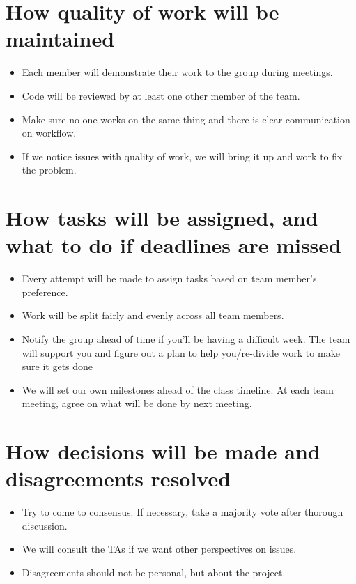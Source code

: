 \documentclass{article}
\begin{document}
\section*{How quality of work will be maintained}
\begin{itemize}
\item Each member will demonstrate their work to the group during meetings.
\item Code will be reviewed by at least one other member of the team.
\item Make sure no one works on the same thing and there is clear communication on workflow.
\item If we notice issues with quality of work, we will bring it up and work to fix the problem.
\end{itemize}

\section*{How tasks will be assigned, and what to do if deadlines are missed}
\begin{itemize}
\item Every attempt will be made to assign tasks based on team member’s preference.
\item Work will be split fairly and evenly across all team members.
\item Notify the group ahead of time if you’ll be having a difficult week. The team will support you and figure out a plan to help you/re-divide work to make sure it gets done
\item We will set our own milestones ahead of the class timeline. At each team meeting, agree on what will be done by next meeting. 
\end{itemize}

\section*{How decisions will be made and disagreements resolved}
\begin{itemize}
\item Try to come to consensus. If necessary, take a majority vote after thorough discussion.
\item We will consult the TAs if we want other perspectives on issues.
\item Disagreements should not be personal, but about the project.
\end{itemize}
\end{document}
